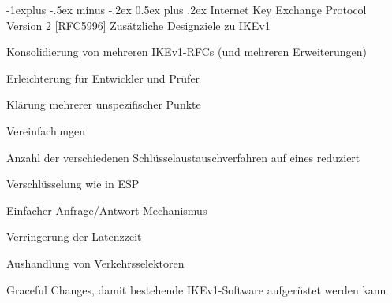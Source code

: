 \documentclass[a4paper]{article}
\makeatletter
\renewcommand{\subsection}{\@startsection{subsection}{2}{0mm}%
 {-1explus -.5ex minus -.2ex}%
 {0.5ex plus .2ex}%
 {\normalfont\normalsize\bfseries}}
\makeatother
\begin{document}
\begin{multicols}{3}
\begin{itemize*}
            \subsection{Internet Key Exchange Protocol Version 2
            {[}RFC5996{]}}
            Zusätzliche Designziele zu IKEv1
            \begin{itemize*}
                  \item       Konsolidierung von mehreren IKEv1-RFCs (und mehreren Erweiterungen)
                  \begin{itemize*}
                        \item Erleichterung für Entwickler und Prüfer
                        \item Klärung mehrerer unspezifischer Punkte
                  \end{itemize*}
                  \item       Vereinfachungen
                  \begin{itemize*}
                        \item Anzahl der verschiedenen Schlüsselaustauschverfahren auf eines reduziert
                        \item Verschlüsselung wie in ESP
                        \item Einfacher Anfrage/Antwort-Mechanismus
                  \end{itemize*}
                  \item       Verringerung der Latenzzeit
                  \item       Aushandlung von Verkehrsselektoren
                  \item       Graceful Changes, damit bestehende IKEv1-Software aufgerüstet werden
                  kann
            \end{itemize*}


\end{itemize*}
\end{multicols}
\end{document}
